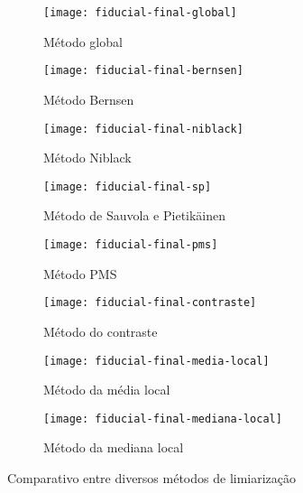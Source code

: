 \documentclass[brazilian,a4paper,twocolumn]{article}
\begin{document}
        \begin{figure}
            \centering
            \begin{subfigure}{0.23\textwidth}
                \texttt{[image: fiducial-final-global]}
                \caption{Método global}
                \label{fig:fiducial-global}
            \end{subfigure}
            \begin{subfigure}{0.23\textwidth}
                \texttt{[image: fiducial-final-bernsen]}
                \caption{Método Bernsen}
                \label{fig:fiducial-bernsen}
            \end{subfigure}
            \begin{subfigure}{0.23\textwidth}
                \texttt{[image: fiducial-final-niblack]}
                \caption{Método Niblack}
                \label{fig:fiducial-niblack}
            \end{subfigure}
            \begin{subfigure}{0.23\textwidth}
                \texttt{[image: fiducial-final-sp]}
                \caption{Método de Sauvola e Pietikäinen}
                \label{fig:fiducial-sp}
            \end{subfigure}
            \begin{subfigure}{0.23\textwidth}
                \texttt{[image: fiducial-final-pms]}
                \caption{Método PMS}
                \label{fig:fiducial-pms}
            \end{subfigure}
            \begin{subfigure}{0.23\textwidth}
                \texttt{[image: fiducial-final-contraste]}
                \caption{Método do contraste}
                \label{fig:fiducial-contraste}
            \end{subfigure}
            \begin{subfigure}{0.23\textwidth}
                \texttt{[image: fiducial-final-media-local]}
                \caption{Método da média local}
                \label{fig:fiducial-media}
            \end{subfigure}
            \begin{subfigure}{0.23\textwidth}
                \texttt{[image: fiducial-final-mediana-local]}
                \caption{Método da mediana local}
                \label{fig:fiducial-mediana}
            \end{subfigure}

            \caption{Comparativo entre diversos métodos de limiarização}
            \label{fig:fiducial-limiarizacao}
        \end{figure}
\end{document}
